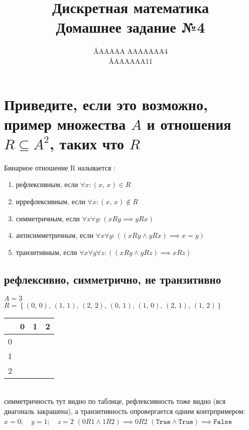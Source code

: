 \documentclass{article}
\title{Дискретная математика \\ Домашнее задание №4}
\author{\AA{AAAAA AAAAAAA}{4} \\ \AA{AAAAAA}{11}}
\newcommand{\ds}{\displaystyle}
\newcommand{\range}{\underline}
\newcommand{\pe}[2]{({#1},\, {#2})}
\newcommand{\p}[2]{\pe{#1}{#2},\,}
\newcommand{\K}{\cellcolor{black}}
\renewcommand{\l}{\left}
\renewcommand{\r}{\right}
\begin{document}
  \maketitle

  \section{Приведите, если это возможно, пример множества $A$ и отношения $R \subseteq A^2$, таких что $R$}
  Бинарное отношение R называется \cite{dashkov}:
  \begin{enumerate}
    \item рефлексивным, если $\forall x: (x,\, x) \in R$
    \item иррефлексивным, если $\forall x: (x,\, x) \not\in R$
    \item симметричным, если $\forall x\forall y: (xRy \implies yRx)$
    \item антисимметричным, если $\forall x\forall y: ((xRy \land yRx) \implies x=y)$
    \item транзитивным, если $\forall x\forall y\forall z: ((xRy \land yRz) \implies xRz)$
  \end{enumerate}
  \subsection{рефлексивно, симметрично, не транзитивно}
  $\ds A = \range{3}$ \\
  $\ds R = \l\{\p{0}{0} \p{1}{1} \p{2}{2} \p{0}{1} \p{1}{0} \p{2}{1} \pe{1}{2} \r\}$ \\
  \setlength\tabcolsep{4pt}
  \begin{tabular}{|c|c|c|c|}
    \hline
      & 0 & 1 & 2 \\ \hline
    0 &\K &\K &   \\ \hline
    1 &\K &\K &\K \\ \hline
    2 &   &\K &\K \\ \hline
  \end{tabular}
  \setlength\tabcolsep{6pt} \\
  симметричность тут видно по таблице, рефлексивность тоже видно (вся диагональ закрашена), а транзитивность опровергается одним контрпримером: \\
  $\ds x = 0;\quad y = 1;\quad z = 2$ \hfill
  $\ds (0R1 \land 1R2) \implies 0R2$ \hfill
  $\ds (\texttt{True} \land \texttt{True}) \implies \texttt{False}$
\end{document}
